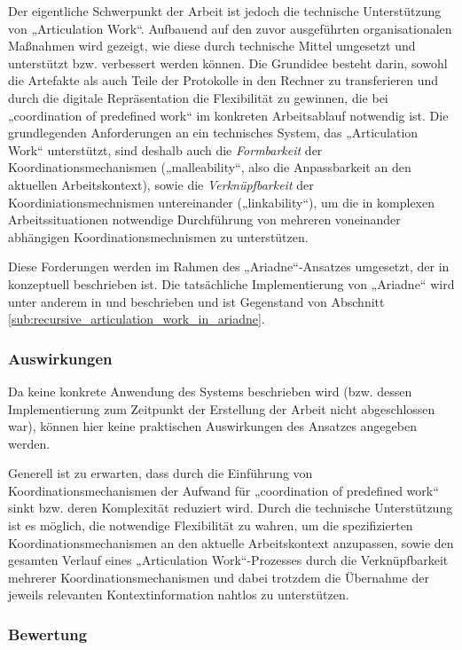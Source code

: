 Der eigentliche Schwerpunkt der Arbeit ist jedoch die technische Unterstützung von „Articulation Work“. Aufbauend auf den zuvor ausgeführten organisationalen Maßnahmen wird gezeigt, wie diese durch technische Mittel umgesetzt und unterstützt bzw. verbessert werden können. Die Grundidee besteht darin, sowohl die Artefakte als auch Teile der Protokolle in den Rechner zu transferieren und durch die digitale Repräsentation die Flexibilität zu gewinnen, die bei „coordination of predefined work“ im konkreten Arbeitsablauf notwendig ist. Die grundlegenden Anforderungen an ein technisches System, das „Articulation Work“ unterstützt, sind deshalb auch die \emph{Formbarkeit} der Koordinationsmechanismen („malleability“, also die Anpassbarkeit an den aktuellen Arbeitskontext), sowie die \emph{Verknüpfbarkeit} der Koordiniationsmechnismen untereinander („linkability“), um die in komplexen Arbeitssituationen notwendige Durchführung von mehreren voneinander abhängigen Koordinationsmechnismen zu unterstützen.

Diese Forderungen werden im Rahmen des „Ariadne“-Ansatzes umgesetzt, der in \citep{Schmidt96} konzeptuell beschrieben ist. Die tatsächliche Implementierung von „Ariadne“ wird unter anderem in \citep{Divitini00} und \citep{Sarini03} beschrieben und ist Gegenstand von Abschnitt \ref{sub:recursive_articulation_work_in_ariadne}.

\subsubsection{Auswirkungen}

Da keine konkrete Anwendung des Systems beschrieben wird (bzw. dessen Implementierung zum Zeitpunkt der Erstellung der Arbeit nicht abgeschlossen war), können hier keine praktischen Auswirkungen des Ansatzes angegeben werden.

Generell ist zu erwarten, dass durch die Einführung von Koordinationsmechanismen der Aufwand für „coordination of predefined work“ sinkt bzw. deren Komplexität reduziert wird. Durch die technische Unterstützung ist es möglich, die notwendige Flexibilität zu wahren, um die spezifizierten Koordinationsmechanismen an den aktuelle Arbeitskontext anzupassen, sowie den gesamten Verlauf eines „Articulation Work“-Prozesses durch die Verknüpfbarkeit mehrerer Koordinationsmechanismen und dabei trotzdem die Übernahme der jeweils relevanten Kontextinformation nahtlos zu unterstützen.

\subsubsection{Bewertung}

